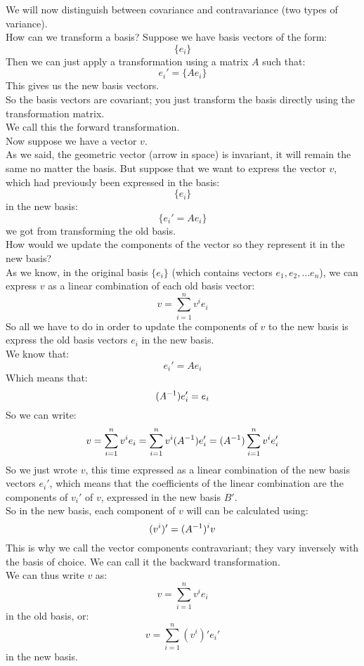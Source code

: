 \documentclass[12pt]{article}
\begin{document}
We will now distinguish between covariance
and contravariance (two types of variance). \\

How can we transform a basis?
Suppose we have basis vectors of the form:
\[ \{ e_i \} \]
Then we can just apply a transformation 
using a matrix $A$ such that:
\[ e_i' = \{ Ae_i \} \]
This gives us the new basis vectors. \\

So the basis vectors are covariant;
you just transform the basis directly
using the transformation matrix. \\
We call this the forward transformation. \\

Now suppose we have a vector $v$. \\
As we said, the geometric vector (arrow in space)
is invariant, it will remain the same
no matter the basis.
But suppose that we want to express
the vector $v$,
which had previously been expressed in
the basis:
\[ \{e_i\} \]
in the new basis:
\[ \{ e_i' = Ae_i \} \]
we got from transforming the old basis. \\
How would we update the components
of the vector so they represent it
in the new basis? \\

As we know, in the original basis $\{e_i\}$
(which contains vectors $e_1, e_2, \dots e_n$),
we can express $v$ as a linear combination
of each old basis vector:
\[ v = \sum_{i = 1}^{n} v^ie_i \]
So all we have to do in order to update the
components of $v$ to the new basis is
express the old basis vectors $e_i$
in the new basis. \\
We know that:
\[ e_i' = Ae_i \]
Which means that:
\[ (A^{-1})e_i' = e_i \]
So we can write:
\[ v = \sum_{i = 1}^{n} v^ie_i
= \sum_{i = 1}^{n} v^i (A^{-1})e_i'
= (A^{-1})\sum_{i = 1}^{n}v^i e_i' \]
So we just wrote $v$,
this time expressed as a linear combination
of the new basis vectors $e_i'$,
which means that the coefficients of the
linear combination are the components
of $v_i'$ of $v$,
expressed in the new basis $B'$. \\ 

So in the new basis, each component of $v$
will can be calculated using:
\[ (v^i)' = (A^{-1})^i v \]
This is why we call the vector components
contravariant;
they vary inversely with the basis of choice.
We can call it the backward transformation. \\

We can thus write $v$ as:
\[ v = \sum_{i = 1}^{n} v^ie_i \]
in the old basis, or:
\[ v = \sum_{i = 1}^{n} (v^i)'e_i' \]
in the new basis. \\
\end{document}
